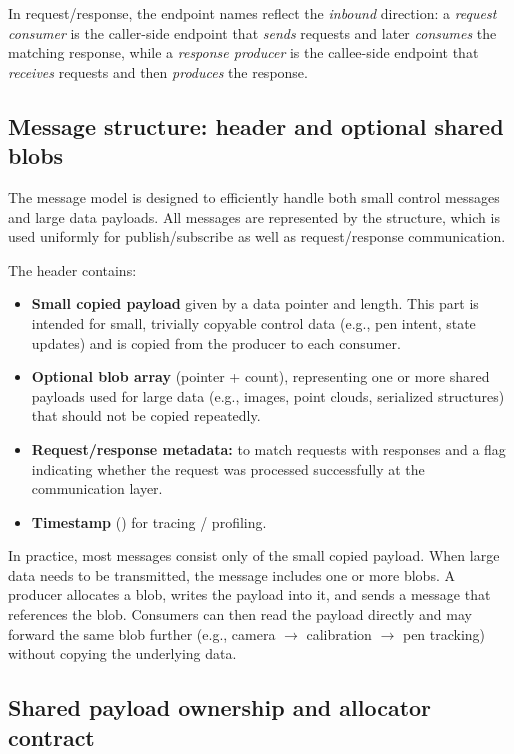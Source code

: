 In request/response, the endpoint names reflect the \emph{inbound} direction:
a \emph{request consumer} is the caller-side endpoint that \emph{sends} requests and later \emph{consumes} the matching response,
while a \emph{response producer} is the callee-side endpoint that \emph{receives} requests and then \emph{produces} the response.


\subsection{Message structure: header and optional shared blobs}

The message model is designed to efficiently handle both small control messages and large data payloads. All messages are represented by the  structure, which is used uniformly for publish/subscribe as well as request/response communication.

The header contains:
\begin{itemize}
    \item \textbf{Small copied payload} given by a data pointer and length. This part is intended for small, trivially copyable control data (e.g., pen intent, state updates) and is copied from the producer to each consumer.
    \item \textbf{Optional blob array} (pointer + count), representing one or more shared payloads used for large data (e.g., images, point clouds, serialized structures) that should not be copied repeatedly.
    \item \textbf{Request/response metadata:}  to match requests with responses and a  flag indicating whether the request was processed successfully at the communication layer.
    \item \textbf{Timestamp} () for tracing / profiling.
\end{itemize}

In practice, most messages consist only of the small copied payload. When large data needs to be transmitted, the message includes one or more blobs. A producer allocates a blob, writes the payload into it, and sends a message that references the blob. Consumers can then read the payload directly and may forward the same blob further (e.g., camera $\rightarrow$ calibration $\rightarrow$ pen tracking) without copying the underlying data.

\subsection{Shared payload ownership and allocator contract} \label{subsec:ch3_allocator_contract}


